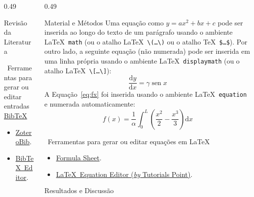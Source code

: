 \documentclass[%
  t,%
  onlytextwidth,%
  compress,%
  xcolor = table,%
  english,%
  brazilian,%
]{beamer}
\begin{document}
\begin{frame}
\begin{columns}
\begin{column}{0.49\textwidth}
\begin{block}{Revisão da Literatura}
\begin{alertblock}{\faInfoCircle\ Ferramentas para gerar ou editar entradas \href{https://www.bibtex.org/}{Bib\TeX\LinkIcon}}%
\begin{itemize}
\item[\scriptsize\faTools] \href{https://zbib.org/}{ZoteroBib\LinkIcon}.
\item[\scriptsize\faTools] \href{https://truben.no/latex/bibtex/}{Bib\TeX\ Editor\LinkIcon}.
\end{itemize}
\end{alertblock}%
\end{block}%
\end{column}%
\hfill%
\begin{column}{0.49\textwidth}%
\begin{block}{Material e Métodos}%
Uma equação como $y = a x^2 + b x + c$ pode ser inserida ao longo do texto de um parágrafo usando o ambiente \LaTeX\ \texttt{math} (ou o atalho \LaTeX\ \texttt{\textbackslash(\ldots\textbackslash)} ou o atalho \TeX\ \texttt{\$\ldots\$}).
Por outro lado, a seguinte equação (não numerada) pode ser inserida em uma linha própria usando o ambiente \LaTeX\ \texttt{displaymath} (ou o atalho \LaTeX\ \texttt{\textbackslash[\ldots\textbackslash]}):
\[
\frac{\mathrm{d} y}{\mathrm{d} x} = \gamma \operatorname{sen} x
\]
A Equação~\eqref{eq:fx} foi inserida usando o ambiente \LaTeX\ \texttt{equation} e numerada automaticamente:
\begin{equation}%
\label{eq:fx}
f{\left(x\right)} = \frac{1}{\alpha} \int_0^L \left(\frac{x^2}{2} - \frac{x^3}{3}\right) \mathrm{d} x
\end{equation}
\begin{alertblock}{\faInfoCircle\ Ferramentas para gerar ou editar equações em \LaTeX}%
\begin{itemize}
\item[\scriptsize\faTools] \href{https://formulasheet.com/}{Formula Sheet\LinkIcon}.
\item[\scriptsize\faTools] \href{https://www.tutorialspoint.com/latex_equation_editor.htm}{\LaTeX\ Equation Editor (\textit{by} Tutorials Point)\LinkIcon}.
\end{itemize}
\end{alertblock}%
\end{block}%
\begin{block}{Resultados e Discussão}%

\end{block}
\end{column}
\end{columns}
\end{frame}
\end{document}
